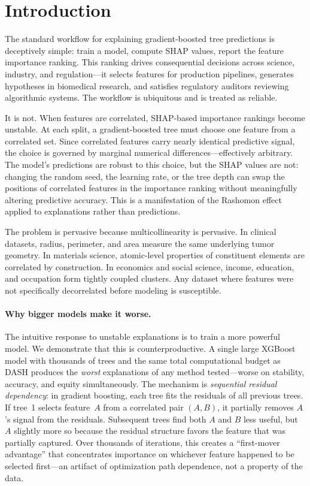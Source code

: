 \documentclass[11pt]{article}
\newcommand{\dash}{\textsc{DASH}}
\begin{document}
\section{Introduction}
\label{sec:introduction}

The standard workflow for explaining gradient-boosted tree predictions is
deceptively simple: train a model, compute SHAP values, report the feature
importance ranking. This ranking drives consequential decisions across
science, industry, and regulation---it selects features for production
pipelines, generates hypotheses in biomedical research, and satisfies
regulatory auditors reviewing algorithmic systems. The workflow is
ubiquitous and is treated as reliable.

It is not. When features are correlated, SHAP-based importance rankings
become unstable. At each split, a gradient-boosted tree must choose one
feature from a correlated set. Since correlated features carry nearly
identical predictive signal, the choice is governed by marginal numerical
differences---effectively arbitrary. The model's predictions are robust to
this choice, but the SHAP values are not: changing the random seed, the
learning rate, or the tree depth can swap the positions of correlated
features in the importance ranking without meaningfully altering predictive
accuracy. This is a manifestation of the Rashomon effect
\citep{breiman2001statistical} applied to explanations rather than
predictions.

The problem is pervasive because multicollinearity is pervasive. In
clinical datasets, radius, perimeter, and area measure the same underlying
tumor geometry. In materials science, atomic-level properties of
constituent elements are correlated by construction. In economics and
social science, income, education, and occupation form tightly coupled
clusters. Any dataset where features were not specifically decorrelated
before modeling is susceptible.

\paragraph{Why bigger models make it worse.}
The intuitive response to unstable explanations is to train a more powerful
model. We demonstrate that this is counterproductive. A single large
XGBoost model with thousands of trees and the same total computational
budget as \dash{} produces the \emph{worst} explanations of any method
tested---worse on stability, accuracy, and equity simultaneously. The
mechanism is \emph{sequential residual dependency}: in gradient boosting,
each tree fits the residuals of all previous trees. If tree~1 selects
feature~$A$ from a correlated pair $(A, B)$, it partially removes $A$'s
signal from the residuals. Subsequent trees find both $A$ and $B$ less
useful, but $A$ slightly more so because the residual structure favors the
feature that was partially captured. Over thousands of iterations, this
creates a ``first-mover advantage'' that concentrates importance on
whichever feature happened to be selected first---an artifact of
optimization path dependence, not a property of the data.
\end{document}
